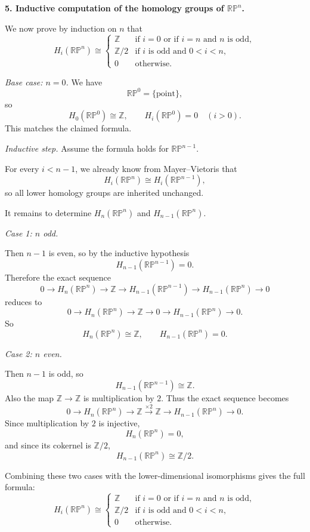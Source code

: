 \documentclass[12pt,a4paper]{article}
\theoremstyle{notespace}
\begin{document}
\medskip

\textbf{5. Inductive computation of the homology groups of \(\mathbb{RP}^n\).}

We now prove by induction on \(n\) that
\[
H_i(\mathbb{RP}^n)\cong
\begin{cases}
	\mathbb Z & \text{if } i=0 \text{ or if } i=n \text{ and } n \text{ is odd},\\[4pt]
	\mathbb Z/2 & \text{if } i \text{ is odd and } 0<i<n,\\[4pt]
	0 & \text{otherwise.}
\end{cases}
\]

\emph{Base case: \(n=0\).}
We have
\[
\mathbb{RP}^0=\{\text{point}\},
\]
so
\[
H_0(\mathbb{RP}^0)\cong \mathbb Z,
\qquad
H_i(\mathbb{RP}^0)=0\quad (i>0).
\]
This matches the claimed formula.

\medskip

\emph{Inductive step.}
Assume the formula holds for \(\mathbb{RP}^{n-1}\).

For every \(i<n-1\), we already know from Mayer--Vietoris that
\[
H_i(\mathbb{RP}^n)\cong H_i(\mathbb{RP}^{n-1}),
\]
so all lower homology groups are inherited unchanged.

It remains to determine \(H_n(\mathbb{RP}^n)\) and \(H_{n-1}(\mathbb{RP}^n)\).

\smallskip

\emph{Case 1: \(n\) odd.}

Then \(n-1\) is even, so by the inductive hypothesis
\[
H_{n-1}(\mathbb{RP}^{n-1})=0.
\]
Therefore the exact sequence
\[
0\to H_n(\mathbb{RP}^n)\to \mathbb Z\to H_{n-1}(\mathbb{RP}^{n-1})\to H_{n-1}(\mathbb{RP}^n)\to 0
\]
reduces to
\[
0\to H_n(\mathbb{RP}^n)\to \mathbb Z\to 0\to H_{n-1}(\mathbb{RP}^n)\to 0.
\]
So
\[
H_n(\mathbb{RP}^n)\cong \mathbb Z,
\qquad
H_{n-1}(\mathbb{RP}^n)=0.
\]

\smallskip

\emph{Case 2: \(n\) even.}

Then \(n-1\) is odd, so
\[
H_{n-1}(\mathbb{RP}^{n-1})\cong \mathbb Z.
\]
Also the map \(\mathbb Z\to \mathbb Z\) is multiplication by \(2\). Thus the exact sequence becomes
\[
0\to H_n(\mathbb{RP}^n)\to \mathbb Z\xrightarrow{\times 2}\mathbb Z\to H_{n-1}(\mathbb{RP}^n)\to 0.
\]
Since multiplication by \(2\) is injective,
\[
H_n(\mathbb{RP}^n)=0,
\]
and since its cokernel is \(\mathbb Z/2\),
\[
H_{n-1}(\mathbb{RP}^n)\cong \mathbb Z/2.
\]

Combining these two cases with the lower-dimensional isomorphisms gives the full formula:
\[
\boxed{
	H_i(\mathbb{RP}^n)\cong
	\begin{cases}
		\mathbb Z & \text{if } i=0 \text{ or if } i=n \text{ and } n \text{ is odd},\\[4pt]
		\mathbb Z/2 & \text{if } i \text{ is odd and } 0<i<n,\\[4pt]
		0 & \text{otherwise.}
	\end{cases}
}
\]
\end{document}
